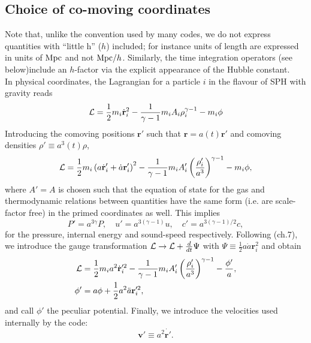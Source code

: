 \subsection{Choice of co-moving coordinates}
\label{ssec:ccordinates}

Note that, unlike the convention used by many codes, we do not express
quantities with ``little h'' ($h$) included; for instance units of
length are expressed in units of $\rm{Mpc}$ and not
${\rm{Mpc}}/h$. Similarly, the time integration operators (see
below)include an $h$-factor via the explicit appearance of
the Hubble constant.\\

In physical coordinates, the Lagrangian for a particle $i$ in the
\cite{Springel2002} flavour of SPH with gravity reads
\begin{equation}
  \mathcal{L} =
  \frac{1}{2} m_i \dot{\mathbf{r}}_i^2 -
  \frac{1}{\gamma-1}m_iA_i\rho_i^{\gamma-1} -
  m_i \phi
\end{equation}
Introducing the comoving positions $\mathbf{r}'$ such that $\mathbf{r}
= a(t) \mathbf{r}'$ and comoving densities $\rho' \equiv a^3(t)\rho$,
\begin{equation}
  \mathcal{L} =
  \frac{1}{2} m_i \left(a\dot{\mathbf{r}}_i' + \dot{a}\mathbf{r}_i'
  \right)^2 - 
  \frac{1}{\gamma-1}m_iA_i'\left(\frac{\rho_i'}{a^3}\right)^{\gamma-1}
  - m_i \phi,
\end{equation}
where $A'=A$ is chosen such that the equation of state for
the gas and thermodynamic relations between quantities have the same
form (i.e. are scale-factor free) in the primed coordinates as
well. This implies
\begin{equation}
  P' = a^{3\gamma}P,\quad u'=a^{3(\gamma-1)}u, \quad c'=a^{3(\gamma-1)/2}c,
\end{equation}
for the pressure, internal energy and sound-speed
respectively. Following \cite{Peebles1980} (ch.7), we introduce the
gauge transformation $\mathcal{L} \rightarrow \mathcal{L} + \frac{d}{dt}\Psi$ with
$\Psi \equiv \frac{1}{2}a\dot{a}\mathbf{r}_i^2$ and obtain
\begin{align}
  \mathcal{L} &= \frac{1}{2}m_ia^2 \dot{\mathbf{r}}_i'^2 -
  \frac{1}{\gamma-1}m_iA_i'\left(\frac{\rho_i'}{a^3}\right)^{\gamma-1}
  -\frac{\phi'}{a},\\
  \phi' &= a\phi + \frac{1}{2}a^2\ddot{a}\mathbf{r}_i'^2,\nonumber
\end{align}
and call $\phi'$ the peculiar potential.  Finally, we introduce the
velocities used internally by the code:
\begin{equation}
  \mathbf{v}' \equiv a^2\dot{\mathbf{r}'}.
\end{equation}
